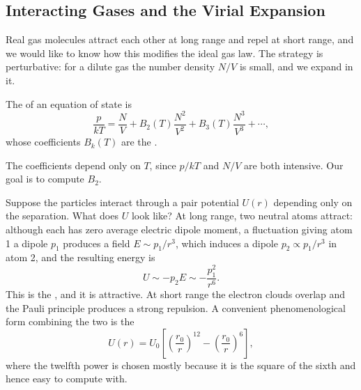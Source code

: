 \documentclass[a4paper]{scrartcl}
\begin{document}
\subsection{Interacting Gases and the Virial Expansion}

Real gas molecules attract each other at long range and repel at short range, and we would like to know how this modifies the ideal gas law. The strategy is perturbative: for a dilute gas the number density $N/V$ is small, and we expand in it.

\begin{definition}
	The  of an equation of state is
	$$
	\frac{p}{kT} = \frac NV + B_2(T)\frac{N^2}{V^2} + B_3(T)\frac{N^3}{V^3} + \cdots,
	$$
	whose coefficients $B_k(T)$ are the .
\end{definition}

The coefficients depend only on $T$, since $p/kT$ and $N/V$ are both intensive. Our goal is to compute $B_2$.

Suppose the particles interact through a pair potential $U(r)$ depending only on the separation. What does $U$ look like? At long range, two neutral atoms attract: although each has zero average electric dipole moment, a fluctuation giving atom 1 a dipole $p_1$ produces a field $E \sim p_1/r^3$, which induces a dipole $p_2 \propto p_1/r^3$ in atom 2, and the resulting energy is
$$
U \sim -p_2 E \sim -\frac{p_1^2}{r^6}.
$$
This is the , and it is attractive. At short range the electron clouds overlap and the Pauli principle produces a strong repulsion. A convenient phenomenological form combining the two is the 
$$
U(r) = U_0\left[\left(\frac{r_0}{r}\right)^{12} - \left(\frac{r_0}{r}\right)^6\right],
$$
where the twelfth power is chosen mostly because it is the square of the sixth and hence easy to compute with.
\end{document}

